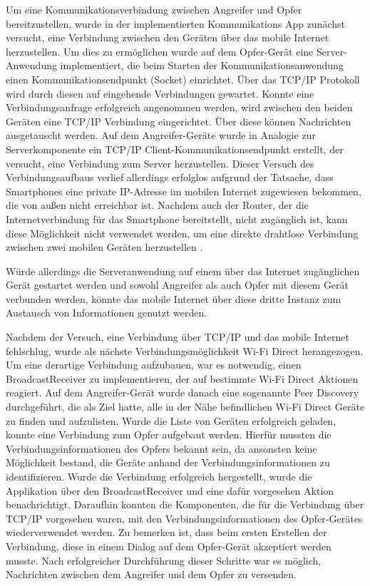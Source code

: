 Um eine Kommunikationsverbindung zwischen Angreifer und Opfer bereitzustellen, wurde in der implementierten Kommunikations App zunächst versucht, eine Verbindung zwischen den Geräten über das mobile Internet herzustellen. Um dies zu ermöglichen wurde auf dem Opfer-Gerät eine Server-Anwendung implementiert, die beim Starten der Kommunikationsanwendung einen Kommunikationsendpunkt (Socket) einrichtet. Über das TCP/IP Protokoll wird durch diesen auf eingehende Verbindungen gewartet. Konnte eine Verbindungsanfrage erfolgreich angenommen werden, wird zwischen den beiden Geräten eine TCP/IP Verbindung eingerichtet. Über diese können Nachrichten ausgetauscht werden. 
Auf dem Angreifer-Geräte wurde in Analogie zur Serverkomponente ein TCP/IP Client-Kommunikationsendpunkt erstellt, der versucht, eine Verbindung zum Server herzustellen. 
Dieser Versuch des Verbindungsaufbaus verlief allerdings erfolglos aufgrund der Tatsache, dass Smartphones eine private IP-Adresse im mobilen Internet zugewiesen bekommen, die von außen nicht erreichbar ist. Nachdem auch der Router, der die Internetverbindung für das Smartphone bereitstellt, nicht zugänglich ist, kann diese Möglichkeit nicht verwendet werden, um eine direkte drahtlose Verbindung zwischen zwei mobilen Geräten herzustellen \cite{androidtcpinternet}. 

Würde allerdings die Serveranwendung auf einem über das Internet zugänglichen Gerät gestartet werden und sowohl Angreifer als auch Opfer mit diesem Gerät verbunden werden, könnte das mobile Internet über diese dritte Instanz zum Austausch von Informationen genutzt werden.

Nachdem der Versuch, eine Verbindung über TCP/IP und das mobile Internet fehlschlug, wurde als nächste Verbindungsmöglichkeit Wi-Fi Direct herangezogen. Um eine derartige Verbindung aufzubauen, war es notwendig, einen BroadcastReceiver zu implementieren, der auf bestimmte Wi-Fi Direct Aktionen reagiert. Auf dem Angreifer-Gerät wurde danach eine sogenannte Peer Discovery durchgeführt, die als Ziel hatte, alle in der Nähe befindlichen Wi-Fi Direct Geräte zu finden und aufzulisten. Wurde die Liste von Geräten erfolgreich geladen, konnte eine Verbindung zum Opfer aufgebaut werden. Hierfür mussten die Verbindungsinformationen des Opfers bekannt sein, da ansonsten keine Möglichkeit bestand, die Geräte anhand der Verbindungsinformationen zu identifizieren. Wurde die Verbindung erfolgreich hergestellt, wurde die Applikation über den BroadcastReceiver und eine dafür vorgesehen Aktion benachrichtigt. Daraufhin konnten die Komponenten, die für die Verbindung über TCP/IP vorgesehen waren, mit den Verbindungsinformationen des Opfer-Gerätes wiederverwendet werden. Zu bemerken ist, dass beim ersten Erstellen der Verbindung, diese in einem Dialog auf dem Opfer-Gerät akzeptiert werden musste.
Nach erfolgreicher Durchführung dieser Schritte war es möglich, Nachrichten zwischen dem Angreifer und dem Opfer zu versenden. 

